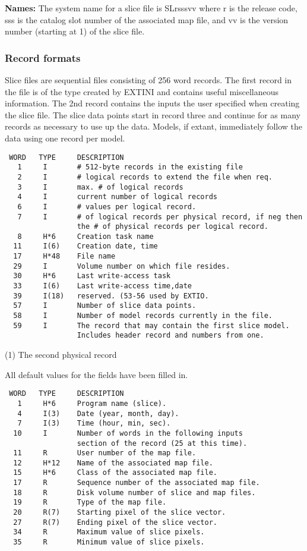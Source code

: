 {\bf Names:} The system name for a slice file is SLrsssvv where r is
the release code, sss is the catalog slot number of the associated
map file, and vv is the version number (starting at 1) of the slice
file.


\subsubsection{Record formats}

   Slice files are sequential files consisting of 256 word records.
The first record in the file is of the type created by EXTINI and
contains useful miscellaneous information.  The 2nd record contains
the inputs the user specified when creating the slice file.  The
slice data points start in record three and continue for as many
records as necessary to use up the data.  Models, if extant,
immediately follow the data using one record per model.

\begin{verbatim}
 WORD   TYPE     DESCRIPTION
   1     I       # 512-byte records in the existing file
   2     I       # logical records to extend the file when req.
   3     I       max. # of logical records
   4     I       current number of logical records
   6     I       # values per logical record.
   7     I       # of logical records per physical record, if neg then
                 the # of physical records per logical record.
   8     H*6     Creation task name
  11     I(6)    Creation date, time
  17     H*48    File name
  29     I       Volume number on which file resides.
  30     H*6     Last write-access task
  33     I(6)    Last write-access time,date
  39     I(18)   reserved. (53-56 used by EXTIO.
  57     I       Number of slice data points.
  58     I       Number of model records currently in the file.
  59     I       The record that may contain the first slice model.
                 Includes header record and numbers from one.
\end{verbatim}

(1) The second physical record

    All default values for the fields have been filled in.

\begin{verbatim}
 WORD   TYPE     DESCRIPTION
   1     H*6     Program name (slice).
   4     I(3)    Date (year, month, day).
   7     I(3)    Time (hour, min, sec).
  10     I       Number of words in the following inputs
                 section of the record (25 at this time).
  11     R       User number of the map file.
  12     H*12    Name of the associated map file.
  15     H*6     Class of the associated map file.
  17     R       Sequence number of the associated map file.
  18     R       Disk volume number of slice and map files.
  19     R       Type of the map file.
  20     R(7)    Starting pixel of the slice vector.
  27     R(7)    Ending pixel of the slice vector.
  34     R       Maximum value of slice pixels.
  35     R       Minimum value of slice pixels.
\end{verbatim}

